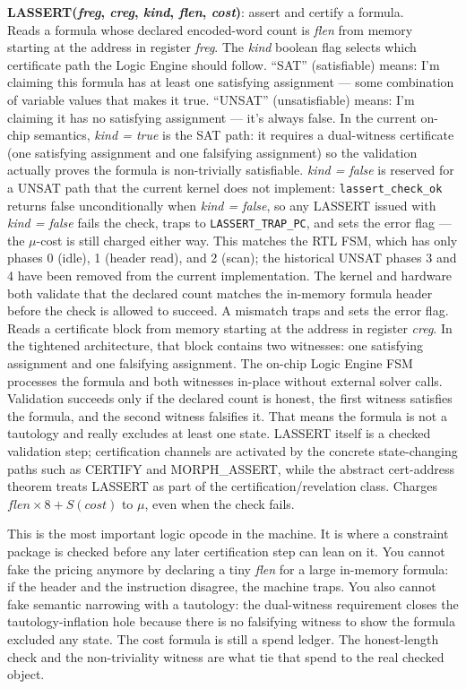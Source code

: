 \documentclass[11pt,a4paper]{article}
\theoremstyle{plain}
\theoremstyle{definition}
\theoremstyle{remark}
\begin{document}
\medskip
\noindent\textbf{LASSERT(\textit{freg}, \textit{creg}, \textit{kind}, \textit{flen}, \textit{cost})}: assert and certify a formula.\\
Reads a formula whose declared encoded-word count is \textit{flen} from memory starting at the address in register \textit{freg}. The \textit{kind} boolean flag selects which certificate path the Logic Engine should follow. ``SAT'' (satisfiable) means: I'm claiming this formula has at least one satisfying assignment --- some combination of variable values that makes it true. ``UNSAT'' (unsatisfiable) means: I'm claiming it has no satisfying assignment --- it's always false. In the current on-chip semantics, \textit{kind = true} is the SAT path: it requires a dual-witness certificate (one satisfying assignment and one falsifying assignment) so the validation actually proves the formula is non-trivially satisfiable. \textit{kind = false} is reserved for a UNSAT path that the current kernel does not implement: \texttt{lassert\_check\_ok} returns false unconditionally when \textit{kind = false}, so any LASSERT issued with \textit{kind = false} fails the check, traps to \texttt{LASSERT\_TRAP\_PC}, and sets the error flag --- the $\mu$-cost is still charged either way. This matches the RTL FSM, which has only phases 0 (idle), 1 (header read), and 2 (scan); the historical UNSAT phases 3 and 4 have been removed from the current implementation. The kernel and hardware both validate that the declared count matches the in-memory formula header before the check is allowed to succeed. A mismatch traps and sets the error flag. Reads a certificate block from memory starting at the address in register \textit{creg}. In the tightened architecture, that block contains two witnesses: one satisfying assignment and one falsifying assignment. The on-chip Logic Engine FSM processes the formula and both witnesses in-place without external solver calls. Validation succeeds only if the declared count is honest, the first witness satisfies the formula, and the second witness falsifies it. That means the formula is not a tautology and really excludes at least one state. LASSERT itself is a checked validation step; certification channels are activated by the concrete state-changing paths such as CERTIFY and MORPH\_ASSERT, while the abstract cert-address theorem treats LASSERT as part of the certification/revelation class. Charges $\mathit{flen} \times 8 + S(\mathit{cost})$ to $\mu$, even when the check fails.

This is the most important logic opcode in the machine. It is where a constraint package is checked before any later certification step can lean on it. You cannot fake the pricing anymore by declaring a tiny \textit{flen} for a large in-memory formula: if the header and the instruction disagree, the machine traps. You also cannot fake semantic narrowing with a tautology: the dual-witness requirement closes the tautology-inflation hole because there is no falsifying witness to show the formula excluded any state. The cost formula is still a spend ledger. The honest-length check and the non-triviality witness are what tie that spend to the real checked object.
\end{document}
